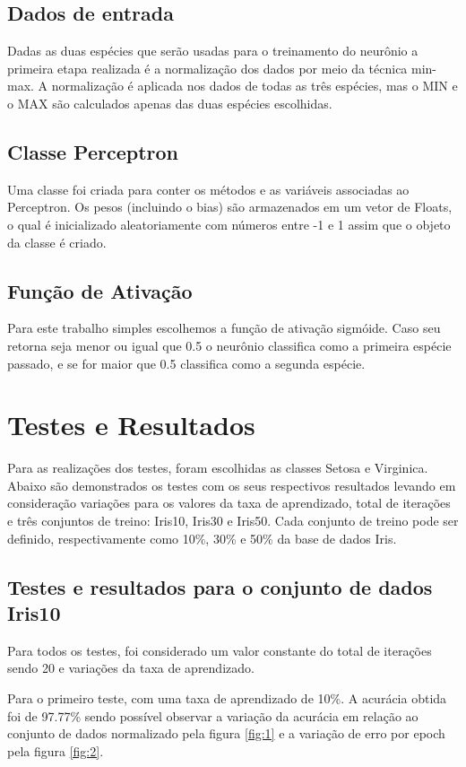 \documentclass[12pt, %
openright, 
oneside, %
a4paper,    %
brazil]{facom-ufu-abntex2}
\begin{document}
\section{Dados de entrada}
Dadas as duas espécies que serão usadas para o treinamento do neurônio a primeira etapa realizada é a normalização dos dados por meio da técnica min-max. A normalização é aplicada nos dados de todas as três espécies, mas o MIN e o MAX são calculados apenas das duas espécies escolhidas.

\section{Classe Perceptron}
Uma classe foi criada para conter os métodos e as variáveis associadas ao Perceptron. Os pesos (incluindo o bias) são armazenados em um vetor de Floats, o qual é inicializado aleatoriamente com números entre -1 e 1 assim que o objeto da classe é criado.

\section{Função de Ativação}
Para este trabalho simples escolhemos a função de ativação sigmóide. Caso seu retorna seja menor ou igual que 0.5 o neurônio classifica como a primeira espécie passado, e se for maior que 0.5 classifica como a segunda espécie.

\chapter{Testes e Resultados}
Para as realizações dos testes, foram escolhidas as classes Setosa e Virginica. Abaixo são demonstrados os testes com os seus respectivos resultados levando em consideração variações para os valores da taxa de aprendizado, total de iterações e três conjuntos de treino: Iris10, Iris30 e Iris50. Cada conjunto de treino pode ser definido, respectivamente como 10\%, 30\% e 50\% da base de dados Iris.

\section{Testes e resultados para o conjunto de dados Iris10}
Para todos os testes, foi considerado um valor constante do total de iterações sendo 20 e variações da taxa de aprendizado.

Para o primeiro teste, com uma taxa de aprendizado de 10\%. A acurácia obtida foi de 97.77\% sendo possível observar a variação da acurácia em relação ao conjunto de dados normalizado pela figura \ref{fig:1} e a variação de erro por epoch pela figura \ref{fig:2}.
\end{document}
